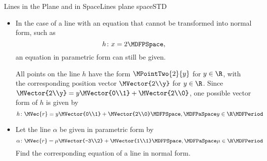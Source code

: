 \begin{MXContent}{Lines in the Plane and in Space}{Lines plane space}{STD}
\begin{MExample}
\begin{itemize}
  First, we transform the equation of a line into normal form:
 \[
  2y-3x=6\MDFPaSpace\Leftrightarrow\MDFPaSpace y=\frac{3}{2}x+3 \MDFPeriod
 \]
  Thus, points on the line $g$ have the form $\MPointTwo[\Big]{x}{\frac{3}{2}x+3}$ , $x\in\R$
  described by the position vector $\MVector{x\\\frac{3}{2}x+3}$, $x\in\R$. Hence, one 
  possible parametric form is given by
 \[
  g\colon \MVec{r}=x\MVector{1\\\frac{3}{2}}+\MVector{0\\3}\MDFPSpace,\MDFPaSpace x\in\R\MDFPeriod
 \]
  Choosing another direction vector collinear to $\MVector{1\\\frac{3}{2}}$ and another reference point 
  on $g$ results in another equation of a line in parametric form. For example, $\MVector{2\\3}$ is 
  collinear to $\MVector{1\\\frac{3}{2}}$ since $\MVector{2\\3}=2\MVector{1\\\frac{3}{2}}$. $\MVector{2\\6}$ is another appropriate reference vector since the coordinates of the point 
  $\MPointTwo{2}{6}$ obviously satisfy the equation of a line. Hence,
 \[
  g\colon \MVec{r}=\sigma\MVector{2\\3}+\MVector{2\\6}\MDFPSpace,\MDFPaSpace \sigma\in\R
 \]
  is another possible parametric form of an equation of the line $g$. 
 \item In the case of a line with an equation that cannot be transformed into 
  normal form, such as 
 \[
  h\colon x=2 \MDFPSpace,
 \]
 an equation in parametric form can still be given.
 
  All points on the line $h$ have the form $\MPointTwo{2}{y}$ for $y\in\R$, with the corresponding 
  position vector $\MVector{2\\y}$ for $y\in\R$. Since $\MVector{2\\y}=y\MVector{0\\1}+\MVector{2\\0}$, 
  one possible vector form of $h$ is given by 
 \[
  h\colon \MVec{r}=y\MVector{0\\1}+\MVector{2\\0}\MDFPSpace,\MDFPaSpace y\in\R\MDFPeriod
 \]
 \item Let the line $\alpha$ be given in parametric form by
 \[
  \alpha\colon \MVec{r}=\mu\MVector{-3\\2} + \MVector{1\\1}\MDFPSpace,\MDFPaSpace \mu\in\R\MDFPeriod
 \]
  Find the corresponding equation of a line in normal form.
 

\end{itemize}
\end{MExample}
\end{MXContent}

